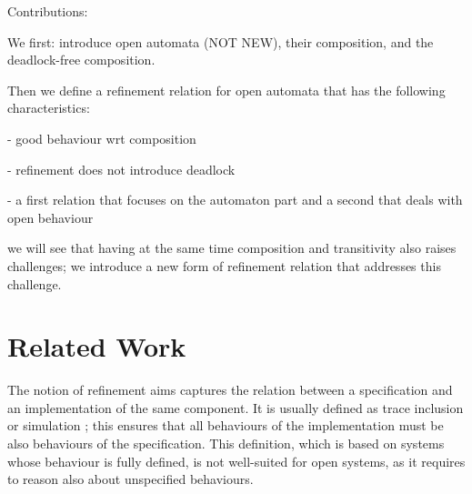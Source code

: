 \documentclass[runningheads]{llncs}
\begin{document}
Contributions:

We first: introduce open automata (NOT NEW), their composition, 
and the deadlock-free composition.

Then we define a refinement relation for open automata that has the following characteristics:

- good behaviour wrt composition

- refinement does not introduce deadlock

- a first relation that focuses on the automaton part 
and a second that deals with open behaviour

we will see that having at the same time composition and transitivity also raises challenges; we introduce a new form of refinement relation that addresses this challenge.


\section{Related Work}
\label{sec:sota}



The notion of refinement aims captures the relation between  a specification and an implementation of the same component. It is usually defined as trace inclusion or simulation \cite{Milner:1980, Kouchnarenko:2007}; this ensures that all behaviours of the implementation must be also behaviours of the specification. This definition, which is based on systems whose behaviour is fully defined, is not well-suited for open systems,  as it requires to reason also about unspecified behaviours.
\end{document}
